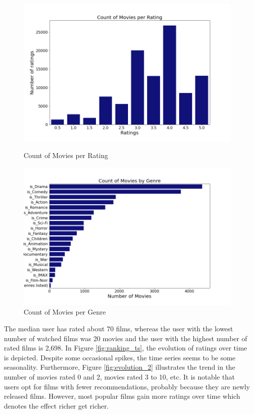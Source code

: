 \documentclass[12pt]{article}
\numberwithin{equation}{section}
\begin{document}
\begin{figure}[h!]
    \begin{minipage}[b]{0.49\linewidth}
         \centering
  	\includegraphics[width=0.99\textwidth]{count_rating.png}
  	\caption{Count of Movies per Rating}
  	\label{fig:count_ranking}
    \end{minipage}
    \hspace{0.01cm}
    \begin{minipage}[b]{0.49\linewidth}
        \centering
  	\includegraphics[width=0.99\textwidth]{count_genre.png}
  	\caption{Count of Movies per Genre}
  	\label{fig:count_genre}
    \end{minipage}
\end{figure}

The median user has rated about 70 films, whereas the user with the lowest number of watched films was 20 movies and the user with the highest number of rated films is 2,698. In Figure \ref{fig:ranking_ts}, the evolution of ratings over time is depicted. Despite some occasional spikes, the time series seems to be some seasonality. Furthermore, Figure \ref{fig:evolution_2} illustrates the trend in the number of movies rated 0 and 2, movies rated 3 to 10, etc. It is notable that users opt for films with fewer recommendations, probably because they are newly released films. However, most popular films gain more ratings over time which denotes the effect richer get richer.
\end{document}
